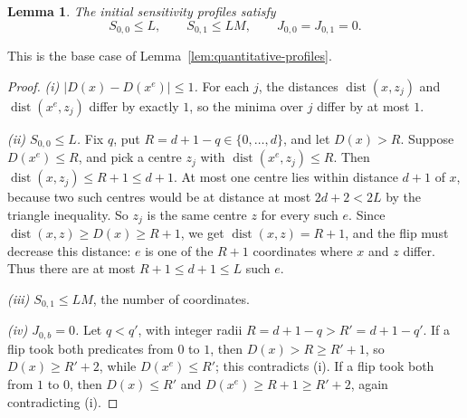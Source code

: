 \documentclass[11pt]{article}
\newtheorem{lemma}[theorem]{Lemma}
\theoremstyle{definition}
\theoremstyle{remark}
\begin{document}
\begin{lemma}\label{lem:base}
The initial sensitivity profiles satisfy
\begin{equation}\label{eq:base-profile}
 S_{0,0}\le L,\qquad S_{0,1}\le LM,\qquad J_{0,0}=J_{0,1}=0.
\end{equation}
\end{lemma}
This is the base case of Lemma~\ref{lem:quantitative-profiles}.
\begin{proof}
\emph{(i) $|D(x)-D(x^e)|\le1$.} For each $j$, the distances
$\operatorname{dist}(x,z_j)$ and $\operatorname{dist}(x^e,z_j)$ differ by
exactly $1$, so the minima over $j$ differ by at most $1$.

\emph{(ii) $S_{0,0}\le L$.} Fix $q$, put $R=d+1-q\in\{0,\ldots,d\}$, and let
$D(x)>R$. Suppose $D(x^e)\le R$, and pick a centre $z_j$ with
$\operatorname{dist}(x^e,z_j)\le R$. Then
$\operatorname{dist}(x,z_j)\le R+1\le d+1$. At most one centre lies within
distance $d+1$ of $x$, because two such centres would be at distance at most
$2d+2<2L$ by the triangle inequality. So $z_j$ is the same centre $z$ for
every such $e$. Since $\operatorname{dist}(x,z)\ge D(x)\ge R+1$, we get
$\operatorname{dist}(x,z)=R+1$, and the flip must decrease this distance:
$e$ is one of the $R+1$ coordinates where $x$ and $z$ differ. Thus there are
at most $R+1\le d+1\le L$ such $e$.

\emph{(iii) $S_{0,1}\le LM$}, the number of coordinates.

\emph{(iv) $J_{0,b}=0$.} Let $q<q'$, with integer radii $R=d+1-q>R'=d+1-q'$.
If a flip took both predicates from $0$ to $1$, then
$D(x)>R\ge R'+1$, so $D(x)\ge R'+2$, while $D(x^e)\le R'$; this contradicts
(i). If a flip took both from $1$ to $0$, then $D(x)\le R'$ and
$D(x^e)\ge R+1\ge R'+2$, again contradicting (i).
\end{proof}
\end{document}
